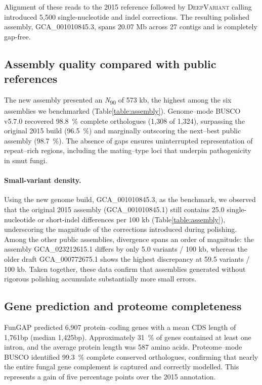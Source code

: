 \documentclass[Journal,letterpaper]{ascelike-new}
\begin{document}
Alignment of these reads to the 2015 reference followed by \textsc{DeepVariant} calling introduced 5,500 single-nucleotide and indel corrections. The resulting polished assembly, GCA\_001010845.3, spans 20.07 Mb across 27 contigs and is completely gap-free.

\subsection*{Assembly quality compared with public references}

The new assembly presented an \textit{N}\textsubscript{90} of 573 kb, the highest among the six assemblies we benchmarked (Table\ref{table:assembly}). Genome--mode BUSCO v5.7.0 recovered 98.8~\% complete orthologues (1,308 of 1,324), surpassing the original 2015 build (96.5~\%) and marginally outscoring the next--best public assembly (98.7~\%). The absence of gaps ensures uninterrupted representation of repeat--rich regions, including the mating--type loci that underpin pathogenicity in smut fungi.

\paragraph{Small-variant density.}
Using the new genome build, GCA\_001010845.3, as the benchmark, we observed that the original 2015 assembly (GCA\_001010845.1) still contains 25.0 single-nucleotide or short-indel differences per 100 kb (Table\ref{table:assembly}), underscoring the magnitude of the corrections introduced during polishing.  Among the other public assemblies, divergence spans an order of magnitude: the assembly GCA\_023212615.1 differs by only 5.0 variants / 100 kb, whereas the older draft GCA\_000772675.1 shows the highest discrepancy at 59.5 variants / 100 kb.  Taken together, these data confirm that assemblies generated without rigorous polishing accumulate substantially more small errors.

\subsection*{Gene prediction and proteome completeness}

FunGAP predicted 6,907 protein--coding genes with a mean CDS length of 1,761bp (median 1,425bp). Approximately 31~\% of genes contained at least one intron, and the average protein length was 587 amino acids. Proteome--mode BUSCO identified 99.3~\% complete conserved orthologues, confirming that nearly the entire fungal gene complement is captured and correctly modelled. This represents a gain of five percentage points over the 2015 annotation.
\end{document}
